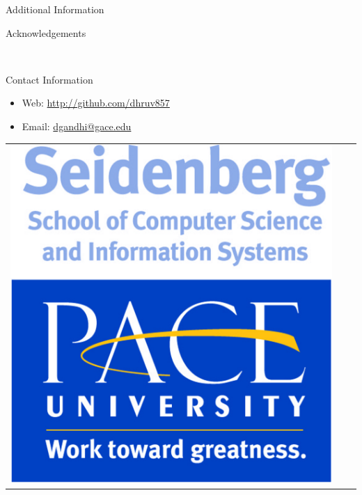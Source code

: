\documentclass[final]{beamer}
\newlength{\onecolwid}
\begin{document}
\begin{frame}[t]
\begin{columns}[t]
\begin{column}{\onecolwid}
\begin{block}{Additional Information}
\end{block}




\begin{block}{Acknowledgements}

\small{} \\

\end{block}



\begin{alertblock}{Contact Information}

\begin{itemize}
\item Web: \href{http://github.com/dhruv857}{http://github.com/dhruv857}
\item Email: \href{mailto:jdgandhi@pace.edu}{dgandhi@gace.edu}
\end{itemize}

\end{alertblock}

\begin{center}
\begin{tabular}{ccc}
\includegraphics[width=0.4\linewidth]{seidenberg.jpg} 
\end{tabular}
\end{center}


\end{column}
\end{columns}
\end{frame}
\end{document}

